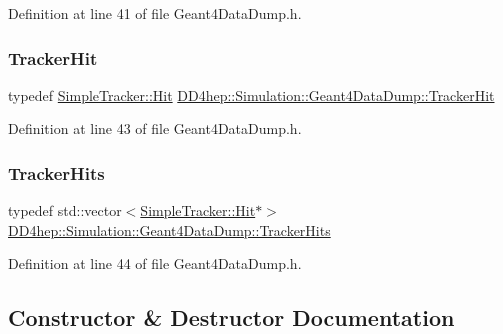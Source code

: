Definition at line 41 of file Geant4\+Data\+Dump.\+h.

\hypertarget{class_d_d4hep_1_1_simulation_1_1_geant4_data_dump_aaeea8b5b317a9a22e13f472200917ad2}{}\label{class_d_d4hep_1_1_simulation_1_1_geant4_data_dump_aaeea8b5b317a9a22e13f472200917ad2} 
\subsubsection{\texorpdfstring{Tracker\+Hit}{TrackerHit}}
{\footnotesize\ttfamily typedef \hyperlink{class_d_d4hep_1_1_simulation_1_1_geant4_tracker_1_1_hit}{Simple\+Tracker\+::\+Hit} \hyperlink{class_d_d4hep_1_1_simulation_1_1_geant4_data_dump_aaeea8b5b317a9a22e13f472200917ad2}{D\+D4hep\+::\+Simulation\+::\+Geant4\+Data\+Dump\+::\+Tracker\+Hit}}



Definition at line 43 of file Geant4\+Data\+Dump.\+h.

\hypertarget{class_d_d4hep_1_1_simulation_1_1_geant4_data_dump_aa71f3341672792aa15c10e82cdbeca4b}{}\label{class_d_d4hep_1_1_simulation_1_1_geant4_data_dump_aa71f3341672792aa15c10e82cdbeca4b} 
\subsubsection{\texorpdfstring{Tracker\+Hits}{TrackerHits}}
{\footnotesize\ttfamily typedef std\+::vector$<$\hyperlink{class_d_d4hep_1_1_simulation_1_1_geant4_tracker_1_1_hit}{Simple\+Tracker\+::\+Hit}$\ast$$>$ \hyperlink{class_d_d4hep_1_1_simulation_1_1_geant4_data_dump_aa71f3341672792aa15c10e82cdbeca4b}{D\+D4hep\+::\+Simulation\+::\+Geant4\+Data\+Dump\+::\+Tracker\+Hits}}



Definition at line 44 of file Geant4\+Data\+Dump.\+h.



\subsection{Constructor \& Destructor Documentation}
\hypertarget{class_d_d4hep_1_1_simulation_1_1_geant4_data_dump_a2709938040240f38f527791859ebaf34}{}\label{class_d_d4hep_1_1_simulation_1_1_geant4_data_dump_a2709938040240f38f527791859ebaf34} 
